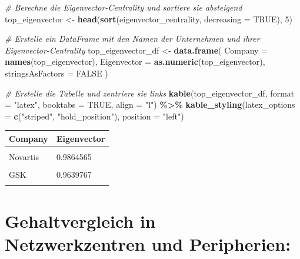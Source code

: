 \documentclass[
]{article}
\newenvironment{Shaded}{\begin{snugshade}}{\end{snugshade}}
\newcommand{\AttributeTok}[1]{\textcolor[rgb]{0.13,0.29,0.53}{#1}}
\newcommand{\CommentTok}[1]{\textcolor[rgb]{0.56,0.35,0.01}{\textit{#1}}}
\newcommand{\ConstantTok}[1]{\textcolor[rgb]{0.56,0.35,0.01}{#1}}
\newcommand{\DecValTok}[1]{\textcolor[rgb]{0.00,0.00,0.81}{#1}}
\newcommand{\FunctionTok}[1]{\textcolor[rgb]{0.13,0.29,0.53}{\textbf{#1}}}
\newcommand{\NormalTok}[1]{#1}
\newcommand{\OtherTok}[1]{\textcolor[rgb]{0.56,0.35,0.01}{#1}}
\newcommand{\SpecialCharTok}[1]{\textcolor[rgb]{0.81,0.36,0.00}{\textbf{#1}}}
\newcommand{\StringTok}[1]{\textcolor[rgb]{0.31,0.60,0.02}{#1}}
\begin{document}
\begin{Shaded}
\begin{Highlighting}[]
\CommentTok{\# Berechne die Eigenvector{-}Centrality und sortiere sie absteigend}
\NormalTok{top\_eigenvector }\OtherTok{\textless{}{-}} \FunctionTok{head}\NormalTok{(}\FunctionTok{sort}\NormalTok{(eigenvector\_centrality, }\AttributeTok{decreasing =} \ConstantTok{TRUE}\NormalTok{), }\DecValTok{5}\NormalTok{)}

\CommentTok{\# Erstelle ein DataFrame mit den Namen der Unternehmen und ihrer Eigenvector{-}Centrality}
\NormalTok{top\_eigenvector\_df }\OtherTok{\textless{}{-}} \FunctionTok{data.frame}\NormalTok{(}
  \AttributeTok{Company =} \FunctionTok{names}\NormalTok{(top\_eigenvector),}
  \AttributeTok{Eigenvector =} \FunctionTok{as.numeric}\NormalTok{(top\_eigenvector),}
  \AttributeTok{stringsAsFactors =} \ConstantTok{FALSE}
\NormalTok{)}

\CommentTok{\# Erstelle die Tabelle und zentriere sie links}
\FunctionTok{kable}\NormalTok{(top\_eigenvector\_df, }\AttributeTok{format =} \StringTok{"latex"}\NormalTok{, }\AttributeTok{booktabs =} \ConstantTok{TRUE}\NormalTok{, }\AttributeTok{align =} \StringTok{"l"}\NormalTok{) }\SpecialCharTok{\%\textgreater{}\%}
  \FunctionTok{kable\_styling}\NormalTok{(}\AttributeTok{latex\_options =} \FunctionTok{c}\NormalTok{(}\StringTok{"striped"}\NormalTok{, }\StringTok{"hold\_position"}\NormalTok{), }\AttributeTok{position =} \StringTok{"left"}\NormalTok{)}
\end{Highlighting}
\end{Shaded}

\begin{tabular}{ll}
\toprule
Company & Eigenvector\\
\midrule
\cellcolor{gray!10}{AstraZeneca} & \cellcolor{gray!10}{1.0000000}\\
Novartis & 0.9864565\\
\cellcolor{gray!10}{Exelixis} & \cellcolor{gray!10}{0.9863625}\\
GSK & 0.9639767\\
\cellcolor{gray!10}{BioMarin Pharmaceutical} & \cellcolor{gray!10}{0.9623126}\\
\bottomrule
\end{tabular}

\section{Gehaltvergleich in Netzwerkzentren und
Peripherien:}\label{gehaltvergleich-in-netzwerkzentren-und-peripherien}
\end{document}
